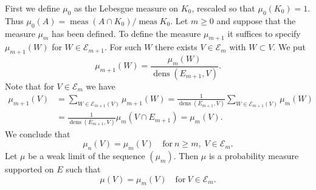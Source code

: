 \documentclass[12pt,a4paper]{amsart}
\theoremstyle{plain}
\theoremstyle{definition}
\theoremstyle{remark}
\def\cE{\mathcal E}
\def\dens{\operatorname{dens}}
\def\meas{\operatorname{meas}}
\numberwithin{equation}{section}
\begin{document}
First we define $\mu_0$ as the Lebesgue measure on $K_0$,
rescaled so that $\mu_0(K_0)=1$. 
Thus $\mu_0(A)=\meas(A\cap K_0)/\meas K_0$.
Let $m\geq 0$ and suppose that the measure $\mu_{m}$ has been defined.
To define the measure $\mu_{m+1}$ it suffices to specify $\mu_{m+1}(W)$
for $W \in \cE_{m+1}$.
For such $W$ there exists $V\in\cE_m$ with $W\subset V$.
We put
\begin{equation}\label{3g0}
\mu_{m+1}(W)=\frac{\mu_{m}(W)}{\dens(E_{m+1},V)}.
\end{equation}
Note that for $V\in\cE_m$ we have
\begin{equation}\label{3g1}
\begin{aligned}
\mu_{m+1}(V)
&=\sum_{W\in\cE_{m+1}(V)} \mu_{m+1}(W)
=\frac{1}{\dens(E_{m+1},V)}\sum_{W\in\cE_{m+1}(V)} \mu_{m}(W)
\\ &
=\frac{1}{\dens(E_{m+1},V)}\mu_m(V\cap E_{m+1})
=\mu_m(V).
\end{aligned}
\end{equation}
We conclude that 
\begin{equation}\label{3g2}
\mu_{n}(V) =\mu_m(V)
\quad\text{for}\ n\geq m,\; V\in\cE_m.
\end{equation}
Let $\mu$ be a weak limit of the sequence $(\mu_m)$. Then
$\mu$ is a probability measure supported on $E$ such that 
\begin{equation}\label{3g3}
\mu(V) =\mu_m(V)
\quad\text{for}\ V\in\cE_m.
\end{equation}
\end{document}

